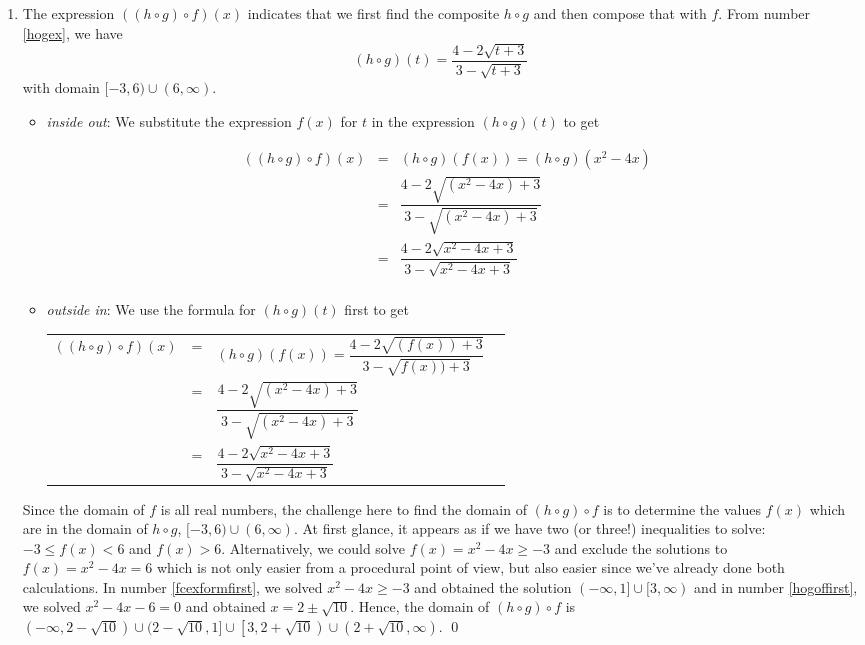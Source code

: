 \begin{ex}
\begin{enumerate}
\item  The expression $((h \circ g) \circ f)(x)$ indicates that we first find the composite $h \circ g$ and then compose that with $f$.  From number \ref{hogex}, we have \[(h \circ g)(t) = \frac{4-2\sqrt{t+3}}{3-\sqrt{t+3}}\]  with domain $[-3, 6) \cup (6, \infty)$.
\begin{itemize}

\item  \textit{inside out}: We substitute the expression $f(x)$ for $t$ in the expression $(h \circ g)(t)$ to get 

\[ \begin{array}{rclr}
((h \circ g) \circ f)(x) & = & (h \circ g)(f(x)) = (h \circ g)\left(x^2-4x\right) & \\ [2pt]
                         & = & \dfrac{4-2\sqrt{\left(x^2-4x\right)+3}}{3-\sqrt{\left(x^2-4x\right)+3}} & \\ [20pt]
                         & = & \dfrac{4 - 2\sqrt{x^2-4x+3}}{3 - \sqrt{x^2-4x+3}} & \\ \end{array}\]

\item  \textit{outside in}:  We use the formula for $(h \circ g)(t)$ first to get
\begin{longtable}{rclr} $((h \circ g) \circ f)(x)$ & = & $(h \circ g)(f(x))=\dfrac{4-2\sqrt{(f(x))+3}}{3-\sqrt{f(x))+3}}$  & \\ [20pt]
  & = & $\dfrac{4 - 2\sqrt{\left(x^2-4x\right)+3}}{3 - \sqrt{\left(x^2-4x\right)+3}}$ & \\[20pt]
 & = & $\dfrac{4 - 2\sqrt{x^2-4x+3}}{3 - \sqrt{x^2-4x+3}}$ & \\
 \end{longtable}
 
 \end{itemize}
 
Since the domain of $f$ is all real numbers, the challenge here to find the domain of $(h \circ g) \circ f$ is to determine the values $f(x)$ which are in the domain of  $h \circ g$,  $[-3, 6) \cup (6, \infty)$.  At first glance, it appears as if we have two (or three!) inequalities to solve:  $-3 \leq f(x) < 6$ and $f(x) > 6$.  Alternatively, we could solve $f(x) = x^2-4x \geq -3$ and exclude the solutions to $f(x) = x^2-4x = 6$ which is not only easier from a procedural point of view, but also easier since we've already done both calculations.   In number \ref{fcexformfirst}, we solved  $x^2-4x \geq -3$ and obtained the solution $(-\infty, 1] \cup [3, \infty)$ and in number \ref{hogoffirst}, we solved $x^2-4x-6 = 0$ and obtained $x = 2 \pm \sqrt{10}$.  Hence, the domain of $(h \circ g) \circ f$ is  $(-\infty, 2 -\sqrt{10}) \cup (2 - \sqrt{10}, 1] \cup \left[3, 2 + \sqrt{10}\right) \cup \left(2+\sqrt{10}, \infty\right)$. \qed

\end{enumerate}

\label{functioncompex1}
\end{ex}

